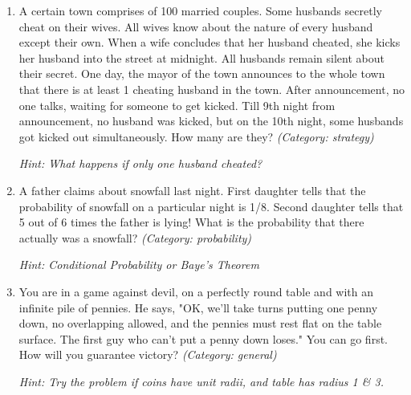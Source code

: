 \begin{enumerate}

\item A certain town comprises of 100 married couples. Some husbands secretly cheat on their wives. All wives know about the nature of every husband except their own. When a wife concludes that her husband cheated, she kicks her husband into the street at midnight. All husbands remain silent about their secret. One day, the mayor of the town announces to the whole town that there is at least 1 cheating husband in the town. After announcement, no one talks, waiting for someone to get kicked. Till 9th night from announcement, no husband was kicked, but on the 10th night, some husbands got kicked out simultaneously. How many are they?
\small\emph{(Category: strategy)}

\small\emph{Hint: What happens if only one husband cheated?}





\item A father claims about snowfall last night. First daughter tells that the probability of snowfall on a particular night is 1/8. Second daughter tells that 5 out of 6 times the father is lying! What is the probability that there actually was a snowfall?
\small\emph{(Category: probability)}

\small\emph{Hint: Conditional Probability or Baye's Theorem}





\item You are in a game against devil, on a perfectly round table and with an infinite pile of pennies. He says, "OK, we'll take turns putting one penny down, no overlapping allowed, and the pennies must rest flat on the table surface. The first guy who can't put a penny down loses." You can go first. How will you guarantee victory?
\small\emph{(Category: general)}

\small\emph{Hint: Try the problem if coins have unit radii, and table has radius 1 \& 3.}





\end{enumerate}
